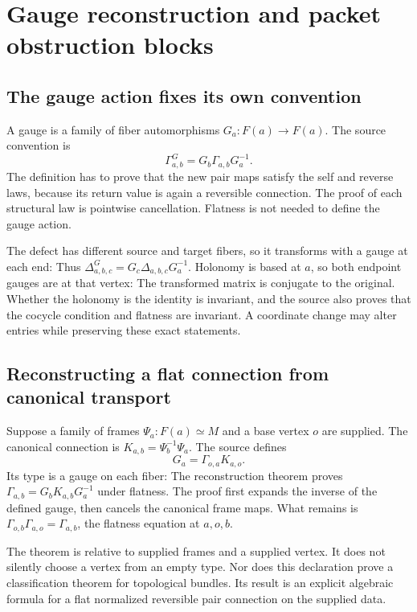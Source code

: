 \clearpage
\section{Gauge reconstruction and packet obstruction blocks}
\subsection{The gauge action fixes its own convention}
A gauge is a family of fiber automorphisms $G_a:F(a)\to F(a)$. The source convention is
\[
 \Gamma^G_{a,b}=G_b\Gamma_{a,b}G_a^{-1}.
\]
The definition has to prove that the new pair maps satisfy the self and reverse laws, because its return value is again a reversible connection.
The proof of each structural law is pointwise cancellation. Flatness is not needed to define the gauge action.

The defect has different source and target fibers, so it transforms with a gauge at each end:
Thus $\Delta^G_{a,b,c}=G_c\Delta_{a,b,c}G_a^{-1}$. Holonomy is based at $a$, so both endpoint gauges are at that vertex:
The transformed matrix is conjugate to the original. Whether the holonomy is the identity is invariant, and the source also proves that the cocycle condition and flatness are invariant. A coordinate change may alter entries while preserving these exact statements.

\subsection{Reconstructing a flat connection from canonical transport}
Suppose a family of frames $\Psi_a:F(a)\simeq M$ and a base vertex $o$ are supplied. The canonical connection is $K_{a,b}=\Psi_b^{-1}\Psi_a$. The source defines
\[
 G_a=\Gamma_{o,a}K_{a,o}.
\]
Its type is a gauge on each fiber:
The reconstruction theorem proves $\Gamma_{a,b}=G_bK_{a,b}G_a^{-1}$ under flatness.
The proof first expands the inverse of the defined gauge, then cancels the canonical frame maps. What remains is $\Gamma_{o,b}\Gamma_{a,o}=\Gamma_{a,b}$, the flatness equation at $a,o,b$.

The theorem is relative to supplied frames and a supplied vertex. It does not silently choose a vertex from an empty type. Nor does this declaration prove a classification theorem for topological bundles. Its result is an explicit algebraic formula for a flat normalized reversible pair connection on the supplied data.

